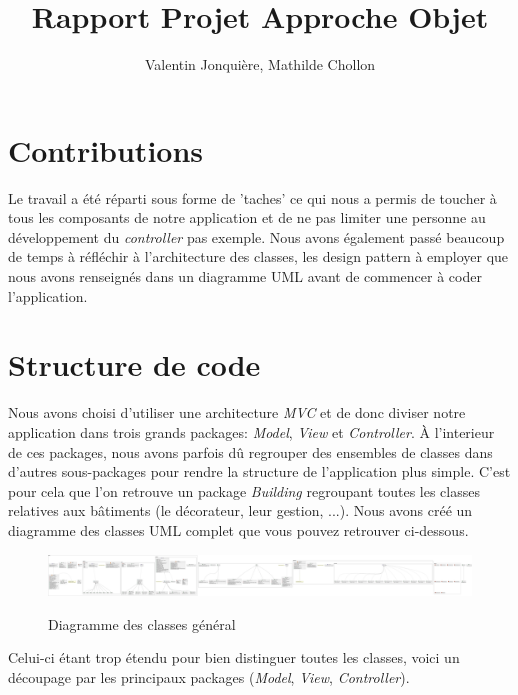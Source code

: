 \documentclass{article}
\author{
    Valentin Jonquière,
    Mathilde Chollon
}
\title{Rapport Projet Approche Objet}
\begin{document}
\maketitle

\pagebreak

\tableofcontents

\pagebreak

\section{Contributions}
Le travail a été réparti sous forme de 'taches' ce qui nous a permis de toucher à tous les composants de notre application
et de ne pas limiter une personne au développement du \textit{controller} pas exemple. Nous avons également passé beaucoup
de temps à réfléchir à l'architecture des classes, les design pattern à employer que nous avons renseignés dans un diagramme
UML avant de commencer à coder l'application.

\section{Structure de code}
Nous avons choisi d'utiliser une architecture \textit{MVC} et de donc diviser notre application dans trois grands packages: \textit{Model}, \textit{View}
et \textit{Controller}. À l'interieur de ces packages, nous avons parfois dû regrouper des ensembles de classes dans d'autres sous-packages pour rendre
la structure de l'application plus simple. C'est pour cela que l'on retrouve un package \textit{Building} regroupant toutes les classes relatives
aux bâtiments (le décorateur, leur gestion, ...). Nous avons créé un diagramme des classes UML complet que vous pouvez retrouver ci-dessous.

\begin{figure}[h]
    \caption{Diagramme des classes général}
    \centering
    \includegraphics[width=\textwidth,height=\textheight,keepaspectratio]{complete_UML}
    \label{fig:UML_complet}
\end{figure}


Celui-ci étant trop étendu pour bien distinguer toutes les classes, voici un découpage par les principaux packages (\textit{Model}, \textit{View}, \textit{Controller}).
\end{document}
